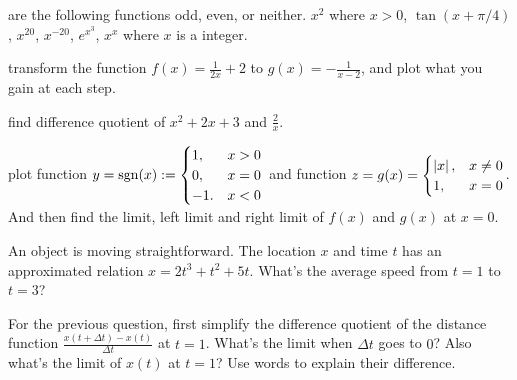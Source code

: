 \documentclass[Calculus 1 Recitation.tex]{subfiles}
\begin{document}
\begin{myleftlinebox}
	are the following functions odd, even, or neither. \(x^2\) where \(x>0\), \(\tan(x+\pi/4)\), \(x^{20}\), \(x^{-20}\), \(e^{x^3}\), $x^x$ where $x$ is a integer.
	\tcblower
	\vspace{5em}
\end{myleftlinebox}

\begin{myleftlinebox}
	transform the function $f(x)=\frac{1}{2x}+2$ to $g(x)=-\frac{1}{x-2}$, and plot what you gain at each step.
	\tcblower
	\vspace{2em}
\end{myleftlinebox}

\begin{myleftlinebox}
	find difference quotient of \(x^2+2x+3\) and \(\frac{2}{x}\).
	\tcblower
	\vspace{2em}
\end{myleftlinebox}

\begin{myleftlinebox}
	plot function $y=\operatorname{\mathrm{sgn}}(x) := \begin{cases}
		1, & x>0\\
		0, & x=0\\
		-1.& x<0
	\end{cases}$ and function $z = g(x)=\begin{cases}
		\left\vert x\right\vert,& x\neq 0\\
		1, &x=0
	\end{cases}$. And then find the limit, left limit and right limit of $f(x)$ and $g(x)$ at $x=0$.
	\tcblower
	\vspace{3em}
\end{myleftlinebox}

\begin{myleftlinebox}
	An object is moving straightforward. The location $x$ and time $t$ has an approximated relation $x = 2t^3+t^2+5t$. What's the average speed from $t=1$ to $t=3$?
	\tcblower
	\vspace{2em}
\end{myleftlinebox}

\begin{myleftlinebox}
	For the previous question, first simplify the difference quotient of the distance function $\frac{x(t+\Delta t)-x(t)}{\Delta t}$ at $t=1$. What's the limit when $\Delta t$ goes to $0$? Also what's the limit of $x(t)$ at $t=1$? Use words to explain their difference.
	\tcblower
	\vspace{2em}
\end{myleftlinebox}
\end{document}
